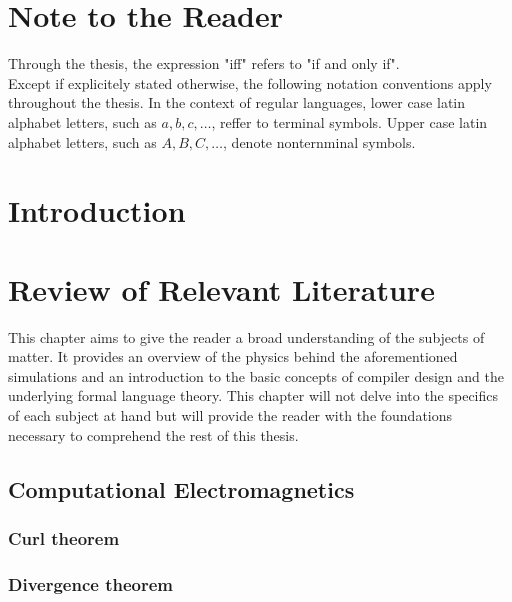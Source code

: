 
% 

\chapter{Note to the Reader}
Through the thesis, the expression "iff" refers to "if and only if".\\
Except if explicitely stated otherwise, the following notation conventions apply throughout the thesis. 
In the context of regular languages, lower case latin alphabet letters, such as $a, b, c, \dots$, reffer to terminal symbols. Upper case latin alphabet letters, such as $A, B, C,\dots$, denote nonternminal symbols.

\chapter{Introduction}

\chapter{Review of Relevant Literature}
This chapter aims to give the reader a broad understanding of the subjects of matter. It provides an overview of the physics behind the aforementioned simulations and an introduction to the basic concepts of compiler design and the underlying formal language theory. This chapter will not delve into the specifics of each subject at hand but will provide the reader with the foundations necessary to comprehend the rest of this thesis.

\section{Computational Electromagnetics}
\subsection*{Curl theorem}
\subsection*{Divergence theorem}

